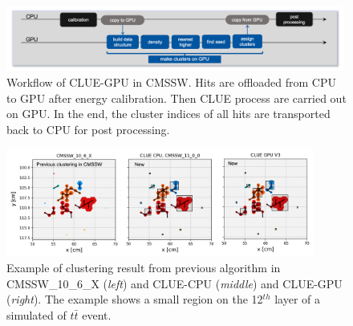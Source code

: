 \begin{figure}[ht]
    \centering
    \includegraphics[trim=0.5cm 0cm 0.5cm 0cm, clip,width=0.99\textwidth]{chapters/HGCal/figures/chep/CMSSWFollow.png}
    \caption{ Workflow of CLUE-GPU in CMSSW. Hits are offloaded from CPU to GPU after energy calibration. Then CLUE process are carried out on GPU. In the end, the cluster indices of all hits are transported back to CPU for post processing.}
    \label{fig:cmssw}
\end{figure}


\begin{figure}[ht]
    \centering
    \includegraphics[trim=0cm 0cm 0cm 0cm, clip, width=0.90\textwidth]{chapters/HGCal/figures/chep/results.png}
    \caption{ Example of clustering result from previous algorithm in CMSSW\_10\_6\_X (\emph{left}) and CLUE-CPU (\emph{middle}) and CLUE-GPU (\emph{right}). The example shows a small region on the 12$^{th}$ layer of a simulated of $t\bar{t}$ event.
    }
    \label{fig:results}
\end{figure}

